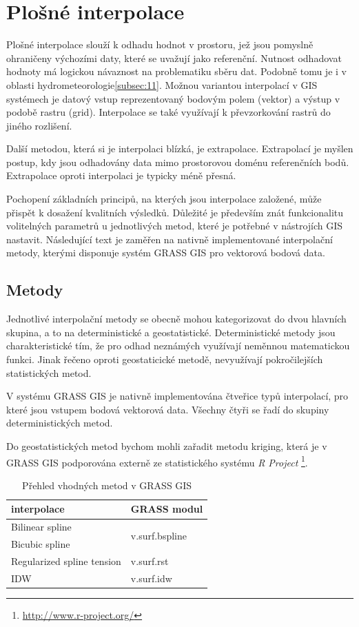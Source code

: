 \documentclass[a4paper,12pt,oneside]{report}
\begin{document}
\setcounter{footnote}{1}
\section{Plošné interpolace }
\label{sec:plostneinterpolace}
Plošné interpolace slouží k odhadu hodnot v prostoru, jež jsou pomyslně ohraničeny výchozími daty, které se uvažují jako referenční. Nutnost odhadovat hodnoty má logickou návaznost na problematiku sběru dat.  Podobně tomu je i v oblasti hydrometeorologie\ref{subsec:11}. Možnou variantou interpolací v GIS systémech je datový vstup reprezentovaný bodovým polem (vektor) a výstup v podobě rastru (grid). Interpolace se také využívají k převzorkování rastrů do jiného rozlišení.

Další metodou, která si je interpolaci blízká, je extrapolace. Extrapolací je myšlen postup, kdy jsou odhadovány data mimo prostorovou doménu referenčních bodů. Extrapolace oproti interpolaci je typicky méně přesná.

Pochopení základních  principů, na  kterých jsou interpolace založené, může přispět k dosažení kvalitních výsledků. Důležité je především znát funkcionalitu volitelných parametrů u jednotlivých metod, které je potřebné v nástrojích GIS nastavit. Následující text je zaměřen na nativně implementované interpolační metody, kterými disponuje systém GRASS GIS pro vektorová bodová data. 


\subsection{Metody}
Jednotlivé interpolační metody se obecně mohou kategorizovat do dvou hlavních skupina, a to na deterministické a geostatistické. 
Deterministické metody jsou charakteristické tím, že pro odhad neznámých využívají neměnnou matematickou funkci. Jinak řečeno oproti geostaticické metodě, nevyužívají pokročilejších statistických metod.

V systému GRASS GIS je nativně implementována čtveřice typů interpolací, pro které jsou vstupem  bodová vektorová data. Všechny čtyři se řadí do skupiny deterministických metod.

Do geostatistických metod bychom mohli zařadit metodu kriging, která je v GRASS GIS podporována externě ze statistického systému \textit{R Project} \footnote{\url{http://www.r-project.org/}}.



\begin{table}[h]
\centering
\begin{tabular}{|ll|}
\hline
interpolace & GRASS modul \\ \hline\hline
Bilinear spline & \multirow{2}{*}{v.surf.bspline} \\
Bicubic spline &  \\
Regularized spline tension & v.surf.rst \\
IDW & v.surf.idw \\ \hline
\end{tabular}
\caption{Přehled vhodných metod v GRASS GIS}
\label{my-label}
\end{table}
\end{document}

